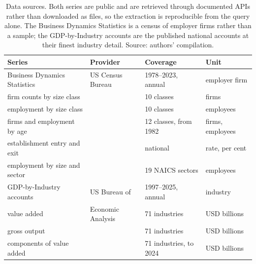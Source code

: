 \begin{table}[H]
\caption{Data sources. Both series are public and are retrieved through documented
APIs rather than downloaded as files, so the extraction is reproducible from the
query alone. The Business Dynamics Statistics is a census of employer firms rather
than a sample; the GDP-by-Industry accounts are the published national accounts at
their finest industry detail. Source: authors' compilation.}
\label{tab:sources}
\begin{tabular}{llll}
\toprule
Series & Provider & Coverage & Unit \\
\midrule
Business Dynamics Statistics & US Census Bureau & 1978--2023, annual & employer firm \\
\quad firm counts by size class & & 10 classes & firms \\
\quad employment by size class & & 10 classes & employees \\
\quad firms and employment by age & & 12 classes, from 1982 & firms, employees \\
\quad establishment entry and exit & & national & rate, per cent \\
\quad employment by size and sector & & 19 NAICS sectors & employees \\
GDP-by-Industry accounts & US Bureau of & 1997--2025, annual & industry \\
\quad value added & \quad Economic Analysis & 71 industries & USD billions \\
\quad gross output & & 71 industries & USD billions \\
\quad components of value added & & 71 industries, to 2024 & USD billions \\
\bottomrule
\end{tabular}
\end{table}
